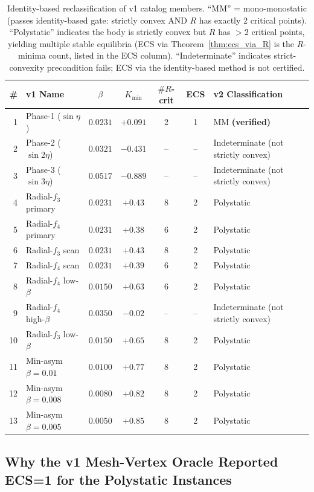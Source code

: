 \documentclass[11pt,a4paper]{article}
\begin{document}
\begin{table}[h]
\centering
\caption{Identity-based reclassification of v1 catalog members.
``MM'' = mono-monostatic (passes identity-based gate: strictly
convex AND $R$ has exactly 2 critical points). ``Polystatic''
indicates the body is strictly convex but $R$ has $>2$ critical
points, yielding multiple stable equilibria (ECS via
Theorem~\ref{thm:ecs_via_R} is the $R$-minima count, listed in the
ECS column). ``Indeterminate'' indicates strict-convexity precondition
fails; ECS via the identity-based method is not certified.}
\label{tab:reclassification}
\small
\begin{tabular}{rlccccl}
\toprule
\# & v1 Name & $\beta$ & $K_{\min}$ & $\#R$-crit & ECS & v2 Classification \\
\midrule
 1 & Phase-1 ($\sin\eta$)    & $0.0231$ & $+0.091$ & 2 & 1 & MM \textbf{(verified)} \\
 2 & Phase-2 ($\sin 2\eta$)  & $0.0321$ & $-0.431$  & -- & -- & Indeterminate (not strictly convex) \\
 3 & Phase-3 ($\sin 3\eta$)  & $0.0517$ & $-0.889$  & -- & -- & Indeterminate (not strictly convex) \\
 4 & Radial-$f_3$ primary    & $0.0231$ & $+0.43$  & 8 & 2 & Polystatic \\
 5 & Radial-$f_4$ primary    & $0.0231$ & $+0.38$  & 6 & 2 & Polystatic \\
 6 & Radial-$f_3$ scan       & $0.0231$ & $+0.43$  & 8 & 2 & Polystatic \\
 7 & Radial-$f_4$ scan       & $0.0231$ & $+0.39$  & 6 & 2 & Polystatic \\
 8 & Radial-$f_4$ low-$\beta$ & $0.0150$ & $+0.63$  & 6 & 2 & Polystatic \\
 9 & Radial-$f_4$ high-$\beta$ & $0.0350$ & $-0.02$  & -- & -- & Indeterminate (not strictly convex) \\
10 & Radial-$f_3$ low-$\beta$ & $0.0150$ & $+0.65$  & 8 & 2 & Polystatic \\
11 & Min-asym $\beta=0.01$   & $0.0100$ & $+0.77$  & 8 & 2 & Polystatic \\
12 & Min-asym $\beta=0.008$  & $0.0080$ & $+0.82$  & 8 & 2 & Polystatic \\
13 & Min-asym $\beta=0.005$  & $0.0050$ & $+0.85$  & 8 & 2 & Polystatic \\
\bottomrule
\end{tabular}
\end{table}

\subsection{Why the v1 Mesh-Vertex Oracle Reported ECS=1 for the
Polystatic Instances}
\end{document}
